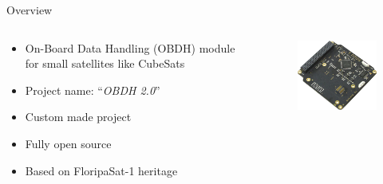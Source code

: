 %
%
%
%
%

%
%
%
%
%

\begin{frame}{Overview}

    \begin{columns}[t]
        \begin{column}[t]{0.5\textwidth}
            \begin{itemize}
                \item On-Board Data Handling (OBDH) module for small satellites like CubeSats
                \vspace{0.3cm}
                \item Project name: ``\textit{OBDH 2.0}''
                \vspace{0.3cm}
                \item Custom made project
                \vspace{0.3cm}
                \item Fully open source
                \vspace{0.3cm}
                \item Based on FloripaSat-1 heritage
            \end{itemize}
        \end{column}
        \begin{column}[t]{0.5\textwidth}
            \begin{figure}[!ht]
                \begin{center}
                    \includegraphics[width=5.5cm]{figures/obdh2-small.png}
                \end{center}
            \end{figure}
        \end{column}
    \end{columns}

\end{frame}

